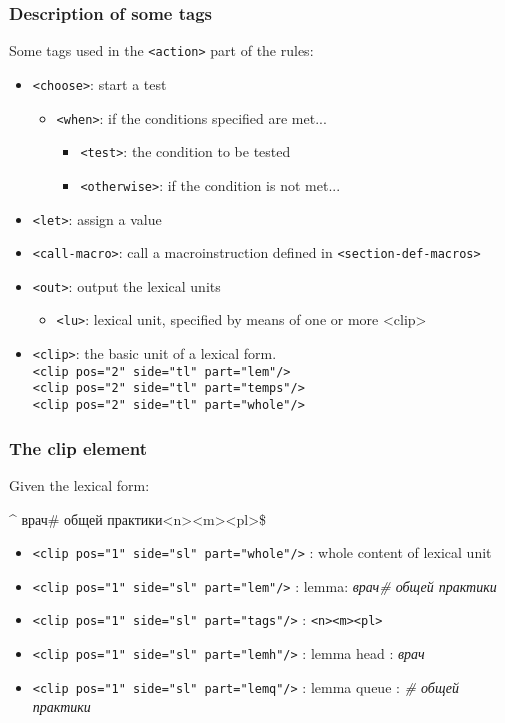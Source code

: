 \documentclass[10pt,xetex]{beamer} %
\begin{document}
\begin{frame}
\frametitle{Description of some tags}
Some tags used in the \texttt{<action>} part of the rules:
\begin{itemize}
  \item \texttt{<choose>}: start a test
  \begin{itemize}
  \item \texttt{<when>}: if the conditions specified are met...
    \begin{itemize}
    \item \texttt{<test>}: the condition to be tested
    \item \texttt{<otherwise>}: if the condition is not met...
    \end{itemize}
  \end{itemize}
\item \texttt{<let>}: assign a value
\item \texttt{<call-macro>}: call a macroinstruction defined in \texttt{<section-def-macros>}
\item \texttt{<out>}: output the lexical units
\begin{itemize}
\item \texttt{<lu>}: lexical unit, specified by means of one or more <clip>
\end{itemize}
\item \texttt{<clip>}: the basic unit of a lexical form.\\
\texttt{<clip pos="2" side="tl" part="lem"/>}\\
\texttt{<clip pos="2" side="tl" part="temps"/>}\\
\texttt{<clip pos="2" side="tl" part="whole"/>}\\

\end{itemize}

\end{frame}


\begin{frame}
\frametitle{The clip element}

Given the lexical form:
\begin{block}{}
\^{} врач\# общей практики<n><m><pl>\$
\end{block}

\begin{itemize}
\item \texttt{<clip pos="1" side="sl" part="whole"/>} : whole content of lexical unit
\item \texttt{<clip pos="1" side="sl" part="lem"/>} : lemma: \emph{врач\# общей практики}
\item \texttt{<clip pos="1" side="sl" part="tags"/>} : \texttt{<n><m><pl>}
\item \texttt{<clip pos="1" side="sl" part="lemh"/>} : lemma head : \emph{врач}
\item \texttt{<clip pos="1" side="sl" part="lemq"/>} : lemma queue : \emph{\# общей практики}

\end{itemize}

\end{frame}
\end{document}
